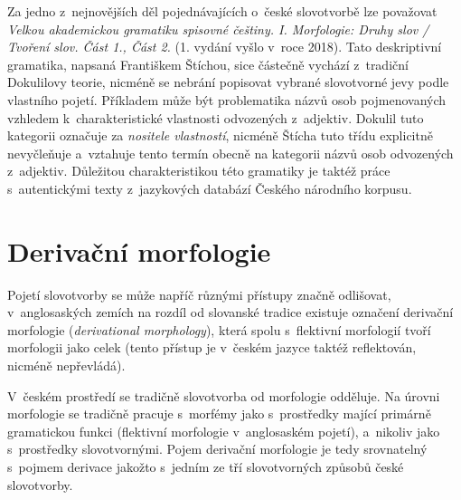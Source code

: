 Za jedno z~nejnovějších děl pojednávajících o~české slovotvorbě lze
považovat \emph{Velkou akademickou gramatiku spisovné češtiny. I.
Morfologie: Druhy slov / Tvoření slov. Část 1., Část 2.} (1. vydání
vyšlo v~roce 2018). Tato deskriptivní gramatika, napsaná Františkem
Štíchou, sice částečně vychází z~tradiční Dokulilovy teorie, nicméně se
nebrání popisovat vybrané slovotvorné jevy podle vlastního pojetí.
Příkladem může být problematika názvů osob pojmenovaných vzhledem
k~charakteristické vlastnosti odvozených z~adjektiv. Dokulil tuto
kategorii označuje za \emph{nositele vlastností}, nicméně Štícha tuto
třídu explicitně nevyčleňuje a~vztahuje tento termín obecně na kategorii
názvů osob odvozených z~adjektiv. Důležitou charakteristikou této
gramatiky je taktéž práce s~autentickými texty z~jazykových databází
Českého národního korpusu. \parencite{sticha18}

\hypertarget{derivaux10dnuxed-morfologie}{%
\section{Derivační morfologie}\label{derivaux10dnuxed-morfologie}}

Pojetí slovotvorby se může napříč různými přístupy značně odlišovat,
v~anglosaských zemích na rozdíl od slovanské tradice existuje označení
derivační morfologie (\emph{derivational morphology}), která spolu
s~flektivní morfologií tvoří morfologii jako celek (tento přístup je
v~českém jazyce taktéž reflektován, nicméně nepřevládá).
\parencite{lieber14}

V~českém prostředí se tradičně slovotvorba od morfologie odděluje. Na
úrovni morfologie se tradičně pracuje s~morfémy jako s~prostředky mající
primárně gramatickou funkci (flektivní morfologie v~anglosaském pojetí),
a~nikoliv jako s~prostředky slovotvornými. Pojem derivační morfologie je
tedy srovnatelný s~pojmem derivace jakožto s~jedním ze tří slovotvorných
způsobů české slovotvorby.
